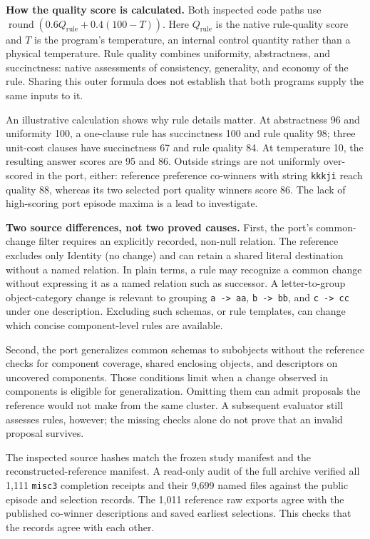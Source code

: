 \documentclass[10pt,letterpaper]{article}
\begin{document}
\textbf{How the quality score is calculated.} Both inspected code paths use
\(\operatorname{round}(0.6 Q_{\mathrm{rule}}+0.4(100-T))\). Here \(Q_{\mathrm{rule}}\) is
the native rule-quality score and \(T\) is the program's temperature, an internal control
quantity rather than a physical temperature. Rule quality combines uniformity,
abstractness, and succinctness: native assessments of consistency, generality, and economy
of the rule. Sharing this outer formula does not establish that both programs supply the
same inputs to it.

An illustrative calculation shows why rule details matter. At abstractness 96 and
uniformity 100, a one-clause rule has succinctness 100 and rule quality 98; three
unit-cost clauses have succinctness 67 and rule quality 84. At temperature 10, the
resulting answer scores are 95 and 86. Outside strings are not uniformly over-scored in
the port, either: reference preference co-winners with string \texttt{kkkji} reach quality
88, whereas its two selected port quality winners score 86. The lack of high-scoring port
episode maxima is a lead to investigate.

\textbf{Two source differences, not two proved causes.} First, the port's common-change
filter requires an explicitly recorded, non-null relation. The reference excludes only
Identity (no change) and can retain a shared literal destination without a named relation.
In plain terms, a rule may recognize a common change without expressing it as a named
relation such as successor. A letter-to-group object-category change is relevant to
grouping \texttt{a\ -\textgreater{}\ aa}, \texttt{b\ -\textgreater{}\ bb}, and
\texttt{c\ -\textgreater{}\ cc} under one description. Excluding such schemas, or rule
templates, can change which concise component-level rules are available.

Second, the port generalizes common schemas to subobjects without the reference checks for
component coverage, shared enclosing objects, and descriptors on uncovered components.
Those conditions limit when a change observed in components is eligible for
generalization. Omitting them can admit proposals the reference would not make from the
same cluster. A subsequent evaluator still assesses rules, however; the missing checks
alone do not prove that an invalid proposal survives.

The inspected source hashes match the frozen study manifest and the
reconstructed-reference manifest. A read-only audit of the full archive verified all 1,111
\texttt{misc3} completion receipts and their 9,699 named files against the public episode
and selection records. The 1,011 reference raw exports agree with the published co-winner
descriptions and saved earliest selections. This checks that the records agree with each
other.
\end{document}
